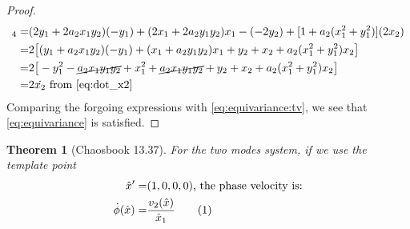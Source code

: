 \documentclass[]{article}
\newcommand\numberthis{\addtocounter{equation}{1}\tag{\theequation}}
\newtheorem{thm}{Theorem}
\begin{document}
\begin{proof}
	\begin{align*}
		[A(\vec{x}) t(\vec{x})]_4 =& (2y_1+2a_2x_1y_2)(-y_1) + (2x_1+2a_2y_1y_2)x_1 - (-2 y_2) + [1+a_2(x_1^2+ y_1^2)](2x_2)\\
		=&2\big[(y_1+a_2x_1y_2)(-y_1) + (x_1+a_2y_1y_2)x_1 + y_2 + x_2+a_2(x_1^2+ y_1^2)x_2\big]\\
		=&2\big[-y_1^2 - \cancel{a_2 x_1 y_1 y_2} +x_1^2 +  \cancel{a_2 x_1 y_1 y_2} + y_2 + x_2+ a_2(x_1^2+ y_1^2)x_2\big]\\
		=& 2 \dot{x_2}  \text{ from \eqref{eq:dot_x2}}
	\end{align*}
	Comparing the forgoing expressions with \eqref{eq:equivariance:tv}, we see that \eqref{eq:equivariance} is satisfied.
\end{proof}

\begin{thm}[Chaosbook 13.37]
	For the two modes system, if we use the template point
	\begin{align*}
		\hat{x}^\prime =& (1,0,0,0) \text{, the phase velocity is:}\\
		\dot{\phi}(\hat{x}) =& \frac{v_2(\hat{x})}{\hat{x}_1} \numberthis \label{eq:two:modes:phase}
	\end{align*}
\end{thm}
\end{document}
